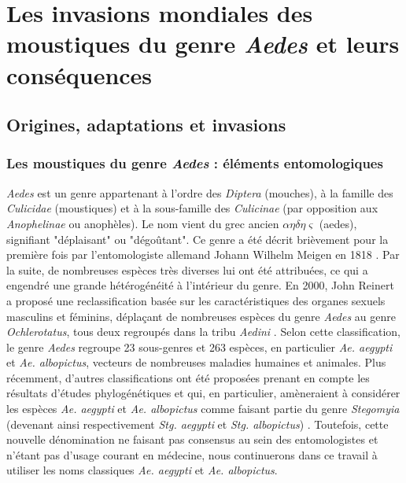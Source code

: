\chapter{Les invasions mondiales des moustiques du genre {\em Aedes} et leurs conséquences}
\chaptermark{}

\section[Origines, adaptations et invasions]{Origines, adaptations et invasions}

\subsection{Les moustiques du genre {\em Aedes} : éléments entomologiques}


{\em Aedes} est un genre appartenant à l'ordre des {\em Diptera} (mouches), à la famille des {\em Culicidae} (moustiques) et à la sous-famille des {\em Culicinae} (par opposition aux {\em Anophelinae} ou anophèles).
Le nom vient du grec ancien  $\alpha \eta \delta \eta \varsigma$ (aedes), signifiant "déplaisant" ou "dégoûtant".
Ce genre a été décrit brièvement pour la première fois par l'entomologiste allemand Johann Wilhelm Meigen en 1818 \cite{meigen1818}.
Par la suite, de nombreuses espèces très diverses lui ont été attribuées, ce qui a engendré une grande hétérogénéité à l'intérieur du genre.
En 2000, John Reinert a proposé une reclassification basée sur les caractéristiques des organes sexuels masculins et féminins, déplaçant de nombreuses espèces du genre {\em Aedes} au genre {\em Ochlerotatus}, tous deux regroupés dans la tribu {\em Aedini} \cite{reinert2000new}.
Selon cette classification, le genre {\em Aedes} regroupe 23 sous-genres et 263 espèces, en particulier {\em Ae. aegypti} et {\em Ae. albopictus}, vecteurs de nombreuses maladies humaines et animales. 
Plus récemment, d'autres classifications ont été proposées prenant en compte les résultats d'études phylogénétiques et qui, en particulier, amèneraient à considérer les espèces {\em Ae. aegypti} et {\em Ae. albopictus} comme faisant partie du genre {\em Stegomyia} (devenant ainsi respectivement {\em Stg. aegypti} et {\em Stg. albopictus}) \cite{reinert2004phylogeny}.
Toutefois, cette nouvelle dénomination ne faisant pas consensus au sein des entomologistes \cite{polaszek2006two} et n'étant pas d'usage courant en médecine, nous continuerons dans ce travail à utiliser les noms classiques {\em Ae. aegypti} et {\em Ae. albopictus}.


